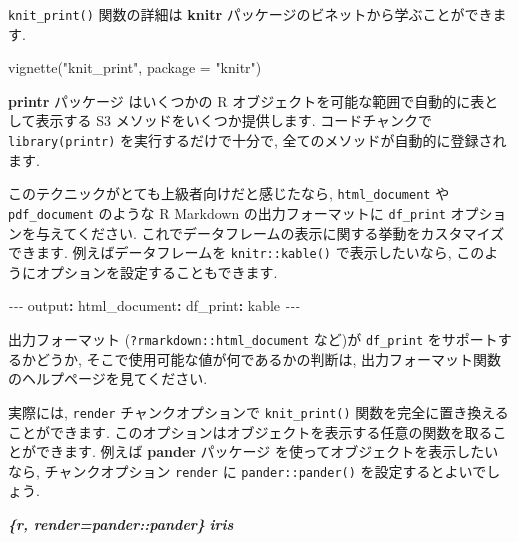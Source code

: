 \documentclass[
  11pt,
  lualatex,
  ja=standard]{bxjsreport}
\newenvironment{Shaded}{\begin{snugshade}}{\end{snugshade}}
\newcommand{\AttributeTok}[1]{\textcolor[rgb]{0.77,0.63,0.00}{#1}}
\newcommand{\FunctionTok}[1]{\textcolor[rgb]{0.00,0.00,0.00}{#1}}
\newcommand{\InformationTok}[1]{\textcolor[rgb]{0.56,0.35,0.01}{\textbf{\textit{#1}}}}
\newcommand{\KeywordTok}[1]{\textcolor[rgb]{0.13,0.29,0.53}{\textbf{#1}}}
\newcommand{\NormalTok}[1]{#1}
\newcommand{\PreprocessorTok}[1]{\textcolor[rgb]{0.56,0.35,0.01}{\textit{#1}}}
\newcommand{\StringTok}[1]{\textcolor[rgb]{0.31,0.60,0.02}{#1}}
\begin{document}
\texttt{knit\_print()} 関数の詳細は \textbf{knitr} パッケージのビネットから学ぶことができます.

\begin{Shaded}
\begin{Highlighting}[numbers=left,,]
\FunctionTok{vignette}\NormalTok{(}\StringTok{"knit\_print"}\NormalTok{, }\AttributeTok{package =} \StringTok{"knitr"}\NormalTok{)}
\end{Highlighting}
\end{Shaded}

\textbf{printr} パッケージ \autocite{R-printr} はいくつかの R オブジェクトを可能な範囲で自動的に表として表示する S3 メソッドをいくつか提供します. コードチャンクで \texttt{library(printr)} を実行するだけで十分で, 全てのメソッドが自動的に登録されます.

このテクニックがとても上級者向けだと感じたなら, \texttt{html\_document} や \texttt{pdf\_document} のような R Markdown の出力フォーマットに \texttt{df\_print} オプションを与えてください. これでデータフレームの表示に関する挙動をカスタマイズできます. 例えばデータフレームを \texttt{knitr::kable()} で表示したいなら, このようにオプションを設定することもできます.

\begin{Shaded}
\begin{Highlighting}[]
\PreprocessorTok{{-}{-}{-}}
\FunctionTok{output}\KeywordTok{:}
\AttributeTok{  }\FunctionTok{html\_document}\KeywordTok{:}
\AttributeTok{    }\FunctionTok{df\_print}\KeywordTok{:}\AttributeTok{ kable}
\PreprocessorTok{{-}{-}{-}}
\end{Highlighting}
\end{Shaded}

出力フォーマット (\texttt{?rmarkdown::html\_document} など)が \texttt{df\_print} をサポートするかどうか, そこで使用可能な値が何であるかの判断は, 出力フォーマット関数のヘルプページを見てください.

実際には, \texttt{render} チャンクオプションで \texttt{knit\_print()} 関数を完全に置き換えることができます. このオプションはオブジェクトを表示する任意の関数を取ることができます. 例えば \textbf{pander} パッケージ を使ってオブジェクトを表示したいなら, チャンクオプション \texttt{render} に \texttt{pander::pander()} を設定するとよいでしょう.

\begin{Shaded}
\begin{Highlighting}[]
\InformationTok{\textasciigrave{}\textasciigrave{}\textasciigrave{}\{r, render=pander::pander\}}
\InformationTok{iris}
\InformationTok{\textasciigrave{}\textasciigrave{}\textasciigrave{}}
\end{Highlighting}
\end{Shaded}
\end{document}
